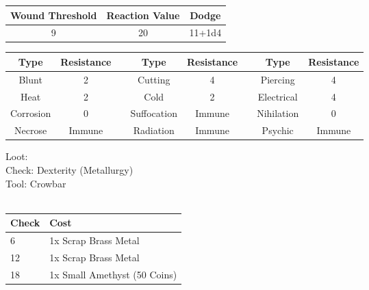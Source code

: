 \bigbreak
\begin{minipage}[H]{1\textwidth}
	\centering
	\begin{tabular}[c]{|c | c | c|}
		\hline
		Wound Threshold & Reaction Value & Dodge\\
		\hline
		9 & 20 & 11+1d4\\
		\hline
	\end{tabular}
\end{minipage}
\bigbreak
\noindent
\begin{minipage}[H]{1\textwidth}
	\centering
	\begin{tabular}[c]{|c | c | c | c | c | c | c | c|}  
		\hline
		Type & Resistance && Type & Resistance && Type & Resistance\\
		\hline
		Blunt & 2 && 
		Cutting & 4 && 
		Piercing & 4\\
		Heat & 2 && 
		Cold & 2 && 
		Electrical & 4\\
		Corrosion & 0 && 
		Suffocation & Immune && 
		Nihilation & 0 \\
		Necrose & Immune && 
		Radiation & Immune && 
		Psychic & Immune\\
		\hline
	\end{tabular}
\end{minipage}
\bigbreak
\noindent
Loot:\\
Check: Dexterity (Metallurgy)\\
Tool: Crowbar\\
\\
\begin{minipage}{0.8\textwidth}
	\begin{tabular}{|l | l|}
		\hline
		Check & Cost\\
		\hline
		6 & 1x Scrap Brass Metal\\
		12 & 1x Scrap Brass Metal\\
		18 & 1x Small Amethyst (50 Coins)\\
		\hline
	\end{tabular}
\end{minipage}
\pagebreak